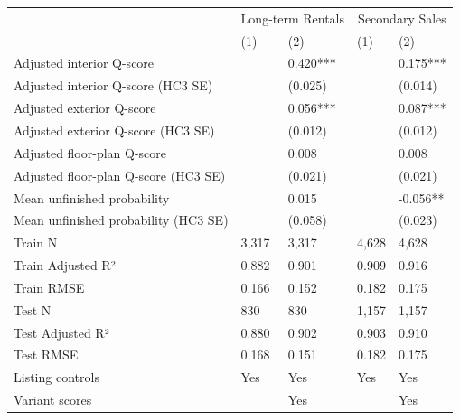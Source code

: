 \begin{tabular}{lllll}
\toprule
 & \multicolumn{2}{r}{Long-term Rentals} & \multicolumn{2}{r}{Secondary Sales} \\
 & (1) & (2) & (1) & (2) \\
\midrule
Adjusted interior Q-score &  & 0.420*** &  & 0.175*** \\
Adjusted interior Q-score (HC3 SE) &  & (0.025) &  & (0.014) \\
Adjusted exterior Q-score &  & 0.056*** &  & 0.087*** \\
Adjusted exterior Q-score (HC3 SE) &  & (0.012) &  & (0.012) \\
Adjusted floor-plan Q-score &  & 0.008 &  & 0.008 \\
Adjusted floor-plan Q-score (HC3 SE) &  & (0.021) &  & (0.021) \\
Mean unfinished probability &  & 0.015 &  & -0.056** \\
Mean unfinished probability (HC3 SE) &  & (0.058) &  & (0.023) \\
Train N & 3,317 & 3,317 & 4,628 & 4,628 \\
Train Adjusted R² & 0.882 & 0.901 & 0.909 & 0.916 \\
Train RMSE & 0.166 & 0.152 & 0.182 & 0.175 \\
Test N & 830 & 830 & 1,157 & 1,157 \\
Test Adjusted R² & 0.880 & 0.902 & 0.903 & 0.910 \\
Test RMSE & 0.168 & 0.151 & 0.182 & 0.175 \\
Listing controls & Yes & Yes & Yes & Yes \\
Variant scores &  & Yes &  & Yes \\
\bottomrule
\end{tabular}
